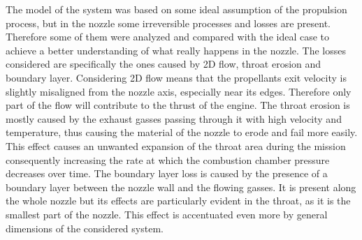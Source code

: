 The model of the system was based on some ideal assumption of the propulsion process, but in the nozzle some irreversible processes and losses are present. Therefore some of them were analyzed and compared with the ideal case to achieve a better understanding of what really happens in the nozzle.
The losses considered are specifically the ones caused by 2D flow, throat erosion and boundary layer. Considering 2D flow means that the propellants exit velocity is slightly misaligned from the nozzle axis, especially near its edges.
Therefore only part of the flow will contribute to the thrust of the engine. The throat erosion is mostly caused by the exhaust gasses passing through it with high velocity and temperature, thus causing the material of the nozzle to erode and fail more easily.
This effect causes an unwanted expansion of the throat area during the mission consequently increasing the rate at which the combustion chamber pressure decreases over time. The boundary layer loss is caused by the presence of a boundary layer between the nozzle wall and the flowing gasses.
It is present along the whole nozzle but its effects are particularly evident in the throat, as it is the smallest part of the nozzle. This effect is accentuated even more by general dimensions of the considered system.